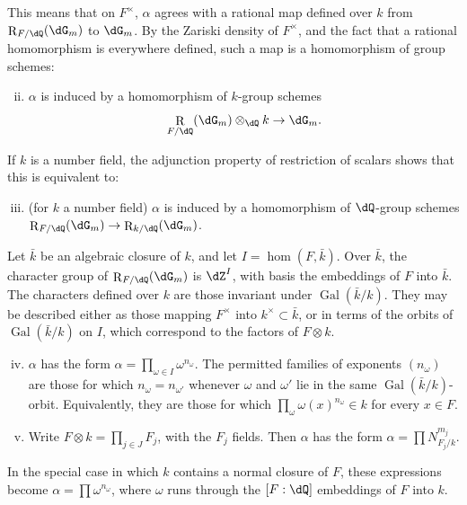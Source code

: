 \documentclass[12pt,oneside,english]{smfbook}
\DeclareMathOperator{\gal}{Gal}
\DeclareMathOperator{\res}{R} %
\newcounter{char}
\begin{document}
This means that on $F^\times$, $\alpha$ agrees with a rational map defined over $k$ from $\res_{F/\dQ}(\dG_m)$ to $\dG_m$. By the Zariski density of $F^\times$, and the fact that a rational homomorphism is everywhere defined, such a map is a homomorphism of group schemes:
\begin{enumerate}[(i)]
\setcounter{enumi}{1}
  \item $\alpha$ is induced by a homomorphism of $k$-group schemes
    \[
      \res_{F/\dQ}(\dG_m)\otimes_\dQ k \to \dG_m \text{.}
    \]
\end{enumerate}

If $k$ is a number field, the adjunction property of restriction of scalars shows that this is equivalent to:
\begin{enumerate}[(i)]
\setcounter{enumi}{2}
  \item (for $k$ a number field) $\alpha$ is induced by a homomorphism of $\dQ$-group schemes $\res_{F/\dQ}(\dG_m)\to\res_{k/\dQ}(\dG_m)$.
\end{enumerate}

Let $\bar k$ be an algebraic closure of $k$, and let $I=\hom(F,\bar k)$. Over $\bar k$, the character group of $\res_{F/\dQ}(\dG_m)$ is $\dZ^I$, with basis the embeddings of $F$ into $\bar k$. The characters defined over $k$ are those invariant under $\gal(\bar k/k)$. They may be described either as those mapping $F^\times$ into $k^\times\subset\bar k$, or in terms of the orbits of $\gal(\bar k/k)$ on $I$, which correspond to the factors of $F\otimes k$.
\begin{enumerate}[(i)]
\setcounter{enumi}{3}
  \item $\alpha$ has the form $\alpha=\prod_{\omega\in I}\omega^{n_\omega}$. The permitted families of exponents $(n_\omega)$ are those for which $n_\omega=n_{\omega'}$ whenever $\omega$ and $\omega'$ lie in the same $\gal(\bar k/k)$-orbit. Equivalently, they are those for which $\prod_\omega\omega(x)^{n_\omega}\in k$ for every $x\in F$.
  \item Write $F\otimes k=\prod_{j\in J}F_j$, with the $F_j$ fields. Then $\alpha$ has the form $\alpha=\prod N_{F_j/k}^{m_j}$.
\end{enumerate}

In the special case in which $k$ contains a normal closure of $F$, these expressions become $\alpha=\prod\omega^{n_\omega}$, where $\omega$ runs through the $[F:\dQ]$ embeddings of $F$ into $k$.

\subsection{}\label{VI:5-2}
\end{document}
